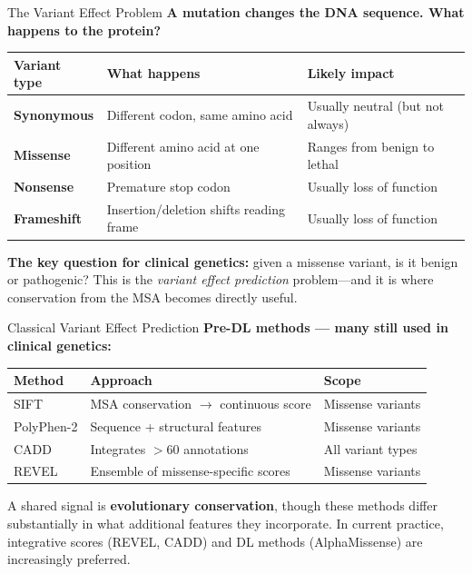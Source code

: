 \documentclass[aspectratio=169,10pt]{beamer}
\begin{document}
\begin{frame}{The Variant Effect Problem}
\textbf{A mutation changes the DNA sequence. What happens to the protein?}

\vspace{0.3em}
\begin{center}
{\small
\renewcommand{\arraystretch}{1.3}
\begin{tabular}{lll}
\toprule
\textbf{Variant type} & \textbf{What happens} & \textbf{Likely impact} \\
\midrule
\textbf{Synonymous} & Different codon, same amino acid & Usually neutral (but not always) \\
\textbf{Missense} & Different amino acid at one position & Ranges from benign to lethal \\
\textbf{Nonsense} & Premature stop codon & Usually loss of function \\
\textbf{Frameshift} & Insertion/deletion shifts reading frame & Usually loss of function \\
\bottomrule
\end{tabular}
}
\end{center}

\pause
\vspace{0.2em}
{\small \textbf{The key question for clinical genetics:} given a missense variant, is it benign or pathogenic? This is the \emph{variant effect prediction} problem---and it is where conservation from the MSA becomes directly useful.}
\end{frame}

\begin{frame}{Classical Variant Effect Prediction}
\textbf{Pre-DL methods --- many still used in clinical genetics:}

\vspace{0.3em}
\begin{center}
{\small
\renewcommand{\arraystretch}{1.3}
\begin{tabular}{lp{5.5cm}p{3.5cm}}
\toprule
\textbf{Method} & \textbf{Approach} & \textbf{Scope} \\
\midrule
SIFT & MSA conservation $\to$ continuous score & Missense variants \\
PolyPhen-2 & Sequence + structural features & Missense variants \\
CADD & Integrates $>60$ annotations & All variant types \\
REVEL & Ensemble of missense-specific scores & Missense variants \\
\bottomrule
\end{tabular}
}
\end{center}

\pause
\vspace{0.2em}
{\small A shared signal is \textbf{evolutionary conservation}, though these methods differ substantially in what additional features they incorporate. In current practice, integrative scores (REVEL, CADD) and DL methods (AlphaMissense) are increasingly preferred.}
\end{frame}
\end{document}

